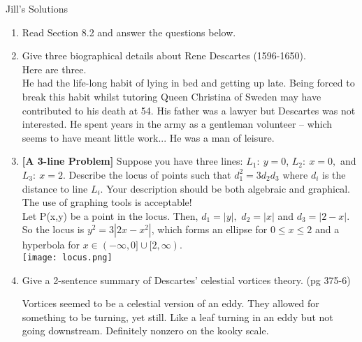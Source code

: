 \documentclass[12pt]{article}
\begin{document}
Jill's Solutions
\begin{enumerate}
\item Read Section 8.2 and answer the questions below.
\item Give three biographical details about Rene Descartes (1596-1650).\\

Here are three.\\
He had the life-long habit of lying in bed and getting up late.  Being forced to break this habit whilst tutoring  Queen Christina of Sweden may have contributed to his death at 54. His father was a lawyer but Descartes was not interested. He spent  years in the army as a gentleman volunteer -- which seems to have meant little work... He was a man of leisure.\\
\vfill
\item \textbf{[A 3-line Problem]} Suppose you have three lines: $L_1: \: y=0$, $L_2: \: x=0,$ and $L_3: \: x=2.$ Describe the locus of points such that $d_1^2=3d_2d_3$ where $d_i$ is the distance to line $L_i.$  Your description should be both algebraic and graphical. The use of graphing tools is acceptable! \\

Let P(x,y) be a point in the locus. Then, $d_1=|y|,$ $d_2=|x|$ and $d_3=|2-x|.$ So the locus is $y^2=3|2x-x^2|$, which forms an ellipse for $0\leq x \leq 2$ and a hyperbola for $x \in (-\infty,0]\cup[2,\infty).$\\

\texttt{[image: locus.png]}
\vfill
\item Give a 2-sentence summary of Descartes' celestial vortices theory. (pg 375-6)

Vortices seemed to be a celestial version of an eddy. They allowed for something to be turning, yet still. Like a leaf turning in an eddy but not going downstream. Definitely nonzero on the kooky scale. 
\vfill
\end{enumerate}
\end{document}
